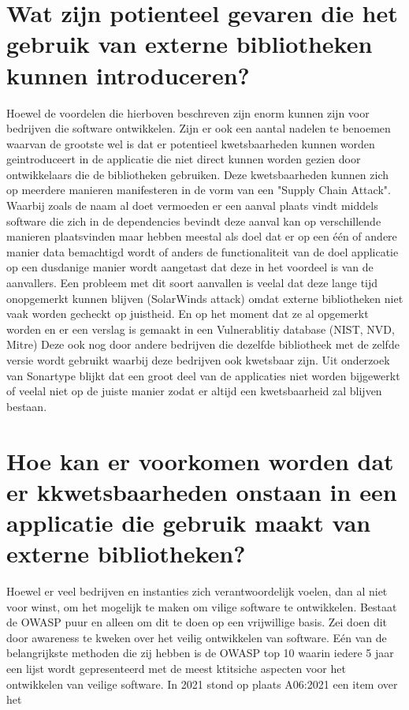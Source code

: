 \section{Wat zijn potienteel gevaren die het gebruik van externe bibliotheken kunnen introduceren?}
Hoewel de voordelen die hierboven beschreven zijn enorm kunnen zijn voor bedrijven die software ontwikkelen. Zijn er ook een aantal nadelen te benoemen waarvan de grootste wel is dat er potentieel kwetsbaarheden kunnen worden geintroduceert in de applicatie die niet direct kunnen worden gezien door ontwikkelaars die de bibliotheken gebruiken. Deze kwetsbaarheden kunnen zich op meerdere manieren manifesteren in de vorm van een "Supply Chain Attack". Waarbij zoals de naam al doet vermoeden er een aanval plaats vindt middels software die zich in de dependencies bevindt deze aanval kan op verschillende manieren plaatsvinden maar hebben meestal als doel dat er op een één of andere manier data bemachtigd wordt of anders de functionaliteit van de doel applicatie op een dusdanige manier wordt aangetast dat deze in het voordeel is van de aanvallers. Een probleem met dit soort aanvallen is veelal dat deze lange tijd onopgemerkt kunnen blijven (SolarWinds attack) omdat externe bibliotheken niet vaak worden gecheckt op juistheid. En op het moment dat ze al opgemerkt worden en er een verslag is gemaakt in een Vulnerablitiy database (NIST, NVD, Mitre) Deze ook nog door andere bedrijven die dezelfde bibliotheek met de zelfde versie wordt gebruikt waarbij deze bedrijven ook kwetsbaar zijn. Uit onderzoek van Sonartype blijkt dat een groot deel van de applicaties niet worden bijgewerkt of veelal niet op de juiste manier zodat er altijd een kwetsbaarheid zal blijven bestaan.





\section{Hoe kan er voorkomen worden dat er kkwetsbaarheden onstaan in een applicatie die gebruik maakt van externe bibliotheken?}
Hoewel er veel bedrijven en instanties zich verantwoordelijk voelen, dan al niet voor winst, om het mogelijk te maken om vilige software te ontwikkelen. Bestaat de OWASP puur en alleen om dit te doen op een vrijwillige basis. Zei doen dit door awareness te kweken over het veilig ontwikkelen van software. Eén van de belangrijkste methoden die zij hebben is de OWASP top 10 waarin iedere 5 jaar een lijst wordt gepresenteerd met de meest ktitsiche aspecten voor het ontwikkelen van veilige software. In 2021 stond op plaats A06:2021 een item over het


